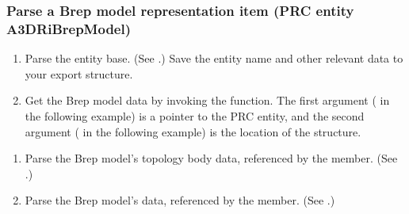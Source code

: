 \documentclass[letterpaper,12pt,english,openany,oneside]{sphinxmanual}
\begin{document}
\subsubsection{Parse a Brep model representation item (PRC entity A3DRiBrepModel)}
\label{\detokenize{Plugins_A3D_API:parse-a-brep-model-representation-item-prc-entity-a3dribrepmodel}}\begin{enumerate}
%
\item {} 
Parse the entity base. (See .) Save the entity name and other relevant data to your export structure.

\item {} 
Get the Brep model data by invoking the  function. The first argument ( in the following example) is a pointer to the PRC entity, and the second argument ( in the following example) is the location of the  structure.

\end{enumerate}

\begin{sphinxVerbatim}[commandchars=\\\{\}]
 
    
\end{sphinxVerbatim}
\begin{enumerate}
%
\item {} 
Parse the Brep model’s topology body data, referenced by the  member. (See .)

\item {} 
Parse the Brep model’s data, referenced by the  member. (See .)

\end{enumerate}
\end{document}
